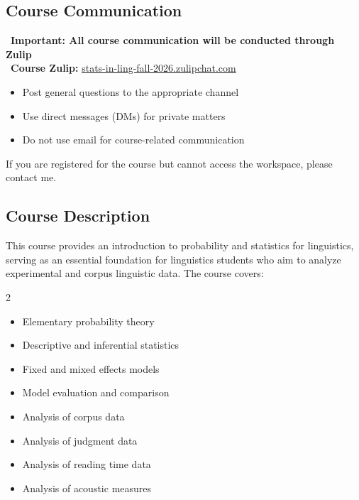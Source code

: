 \documentclass[11pt,letterpaper]{article}
\begin{document}
\subsection{Course Communication}

\begin{tcolorbox}[
    colback=urgold!10,
    colframe=urgold,
    boxrule=1pt,
    arc=2mm,
    left=10pt,
    right=10pt
]
\faExclamationTriangle\ \textbf{Important: All course communication will be conducted through Zulip}\\

\faComments\ \textbf{Course Zulip:} \href{https://stats-in-ling-fall-2026.zulipchat.com/}{stats-in-ling-fall-2026.zulipchat.com}
\begin{itemize}[leftmargin=*,itemsep=2pt]
    \item Post general questions to the appropriate channel
    \item Use direct messages (DMs) for private matters
    \item Do not use email for course-related communication
\end{itemize}
\vspace{1em}
If you are registered for the course but cannot access the workspace, please contact me.
\end{tcolorbox}

\subsection{Course Description}

This course provides an introduction to probability and statistics for linguistics, serving as an essential foundation for linguistics students who aim to analyze experimental and corpus linguistic data. The course covers:

\begin{multicols}{2}
\begin{itemize}[leftmargin=*,itemsep=0pt]
    \item Elementary probability theory
    \item Descriptive and inferential statistics
    \item Fixed and mixed effects models
    \item Model evaluation and comparison
    \item Analysis of corpus data
    \item Analysis of judgment data
    \item Analysis of reading time data
    \item Analysis of acoustic measures
\end{itemize}
\end{multicols}
\end{document}
